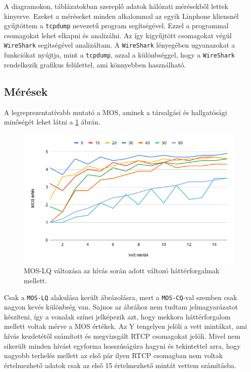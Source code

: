 A diagramokon, táblázatokban szereplő adatok hálózati mérésekből lettek kinyerve. Ezeket 
a méréseket minden alkalommal az egyik Linphone kliensnél gyűjtöttem a \texttt{tcpdump} 
nevezetű program segítségével. Ezzel a programmal csomagokat lehet elkapni és analizálni. 
Az így kigyűjtött csomagokat végül \texttt{WireShark} segítségével analizáltam. A 
\texttt{WireShark} lényegében ugyanazokat a funkciókat nyújtja, mint a \texttt{tcpdump}, 
azzal a különbséggel, hogy a \texttt{WireShark} rendelkezik grafikus felülettel, ami 
könnyebben használható. 

\subsection{Mérések}

A legreprezentatívabb mutató a MOS, aminek a társalgási és hallgatósági minőségét lehet 
látni a \ref{fig:moslq} ábrán.

\begin{figure}[!ht]
	\centering
	\includegraphics[width=1\textwidth, keepaspectratio]{figures/moslq.png}
	\caption{MOS-LQ változása az hívás során adott változó háttérforgalmak mellett.}
	\label{fig:moslq}
\end{figure}

Csak a \texttt{MOS-LQ} alakulása került ábrázolásra, mert a \texttt{MOS-CQ}-val szemben 
csak nagyon kevés különbség van. Sajnos az ábrához nem tudtam jelmagyarázatot készíteni, 
így a vonalak színei jelképezik azt, hogy mekkora háttérforgalom mellett voltak mérve a 
MOS értékek. Az Y tengelyen jelöli a vett mintákat, ami hívás kezdetétől számított és 
megvizsgált RTCP csomagokat jelöli. Mivel nem sikerült minden hívást egyforma 
hosszúságúra hagyni és tekintettel arra, hogy nagyobb terhelés mellett az első pár ilyen 
RTCP csomagban nem voltak értelmezhető adatok csak az első 15 értelmezhető mintát vettem 
számításba.

